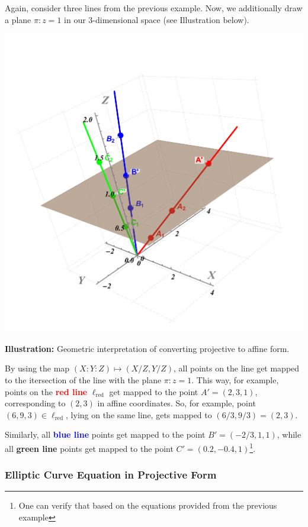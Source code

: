 \documentclass[../lecture-notes.tex]{subfiles}
\begin{document}
\begin{example}
    Again, consider three lines from the previous example. Now, we additionally draw a plane $\pi: z=1$ in our 3-dimensional space (see Illustration below).

    \begin{center}
        \includegraphics[trim={100 100 100 200}, width=0.45\linewidth, clip]{images/lecture_4/line_2.pdf}
        
        \small{\textbf{Illustration:} Geometric interpretation of converting projective to affine form.}
    \end{center}

    By using the map $(X:Y:Z) \mapsto (X/Z,Y/Z)$, all points on the line get mapped to the itersection of the line with the plane $\pi: z=1$. This way, for example, points on the \textcolor{red}{\textbf{red line}} $\ell_{\text{red}}$ get mapped to the point $A'=(2,3,1)$, corresponding to $(2,3)$ in affine coordinates. So, for example, point $(6,9,3) \in \ell_{\text{red}}$, lying on the same line, gets mapped to $(6/3,9/3) = (2,3)$.

    Similarly, all \textcolor{blue}{\textbf{blue line}} points get mapped to the point $B'=(-2/3,1,1)$, while all \textcolor{green!60!black}{\textbf{green line}} points get mapped to the point $C'=(0.2,-0.4,1)$\footnote{One can verify that based on the equations provided from the previous example}.
\end{example}

\subsubsection{Elliptic Curve Equation in Projective Form}
\end{document}
